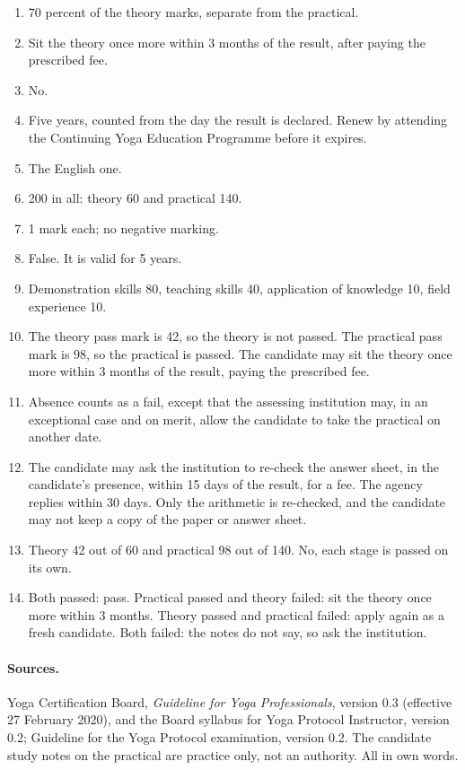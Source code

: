 \begin{enumerate}
\item 70 percent of the theory marks, separate from the practical.
\item Sit the theory once more within 3 months of the result, after paying the prescribed fee.
\item No.
\item Five years, counted from the day the result is declared. Renew by attending the Continuing Yoga Education Programme before it expires.
\item The English one.
\item 200 in all: theory 60 and practical 140.
\item 1 mark each; no negative marking.
\item False. It is valid for 5 years.
\item Demonstration skills 80, teaching skills 40, application of knowledge 10, field experience 10.
\item The theory pass mark is 42, so the theory is not passed. The practical pass mark is 98, so the practical is passed. The candidate may sit the theory once more within 3 months of the result, paying the prescribed fee.
\item Absence counts as a fail, except that the assessing institution may, in an exceptional case and on merit, allow the candidate to take the practical on another date.
\item The candidate may ask the institution to re-check the answer sheet, in the candidate's presence, within 15 days of the result, for a fee. The agency replies within 30 days. Only the arithmetic is re-checked, and the candidate may not keep a copy of the paper or answer sheet.
\item Theory 42 out of 60 and practical 98 out of 140. No, each stage is passed on its own.
\item Both passed: pass. Practical passed and theory failed: sit the theory once more within 3 months. Theory passed and practical failed: apply again as a fresh candidate. Both failed: the notes do not say, so ask the institution.
\end{enumerate}

\paragraph{Sources.} Yoga Certification Board, \emph{Guideline for Yoga Professionals}, version 0.3 (effective 27 February 2020), and the Board syllabus for Yoga Protocol Instructor, version 0.2; Guideline for the Yoga Protocol examination, version 0.2. The candidate study notes on the practical are practice only, not an authority. All in own words.
